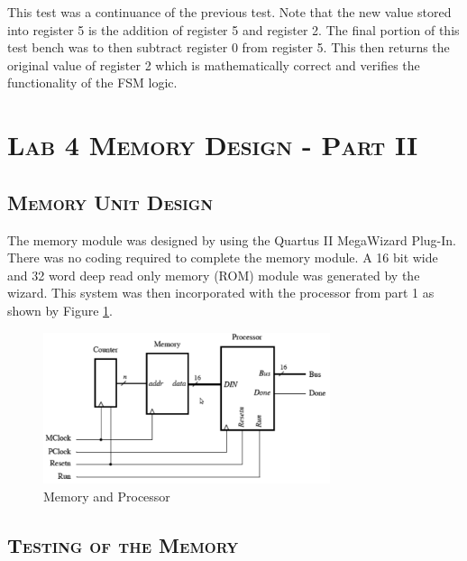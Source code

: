 \documentclass[11pt]{report}
\begin{document}
\begin{spacing}{1.5}
This test was a continuance of the previous test.  Note that the new value stored into register 5 is the addition of register 5 and register 2.  The final portion of this test bench was to then subtract register 0 from register 5.  This then returns the original value of register 2 which is mathematically correct and verifies the functionality of the FSM logic.

\clearpage

\section*{\scshape Lab 4 Memory Design - Part II} %
\label{sec:fsm_design}

\setcounter{chapter}{2}
\setcounter{section}{1}
\setcounter{subsection}{0}
\subsection{\scshape Memory Unit Design}
\label{sub:design_piso}

The memory module was designed by using the Quartus II MegaWizard Plug-In.  There was no coding required to complete the memory module.  A 16 bit wide and 32 word deep read only memory (ROM) module was generated by the wizard.  This system was then incorporated with the processor from part 1 as shown by Figure \ref{fig:memory}.

\vspace{15px}
\begin{figure}[H]
    \centering
    \includegraphics[width=0.75\textwidth,keepaspectratio]{part2.png}
    \caption{Memory and Processor}
    \label{fig:memory}
\end{figure}

\subsection{\scshape Testing of the Memory}
\label{sub:test_piso}


\end{spacing}
\end{document}
